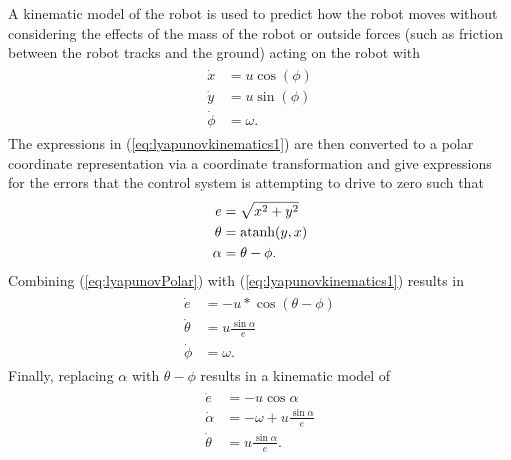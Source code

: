 A kinematic model of the robot is used to predict how the robot moves without considering the effects of the mass of the robot or outside forces (such as friction between the robot tracks and the ground) acting on the robot with
\begin{align}
\label{eq:lyapunovkinematics1}
\begin{split}
\dot{x} &= u\cos(\phi) \\
\dot{y} &= u\sin(\phi) \\
\dot{\phi} &= \omega.
\end{split}
\end{align}
The expressions in (\ref{eq:lyapunovkinematics1}) are then converted to a polar coordinate representation via a coordinate transformation and give expressions for the errors that the control system is attempting to drive to zero such that
\begin{align}
\label{eq:lyapunovPolar}
\begin{split}
e &= \sqrt{x^2+y^2} \\
\theta &= \mathop{\text{atanh}}(y,x) \\
\alpha &= \theta - \phi.
\end{split}
\end{align}
Combining (\ref{eq:lyapunovPolar}) with (\ref{eq:lyapunovkinematics1}) results in
\begin{align*}
\begin{split}
\dot{e} &= -u*\cos(\theta-\phi) \\
\dot{\theta} &= u\frac{\sin\alpha}{e} \\
\dot{\phi} &= \omega.
\end{split}
\end{align*}
Finally, replacing $\alpha$ with $\theta-\phi$ results in a kinematic model of
\begin{align}
\label{eq:lyapunovkinematics}
\begin{split}
\dot{e} &= -u\cos\alpha \\
\dot{\alpha} &= -\omega + u\frac{\sin\alpha}{e} \\
\dot{\theta} &= u\frac{\sin\alpha}{e}.
\end{split}
\end{align}

